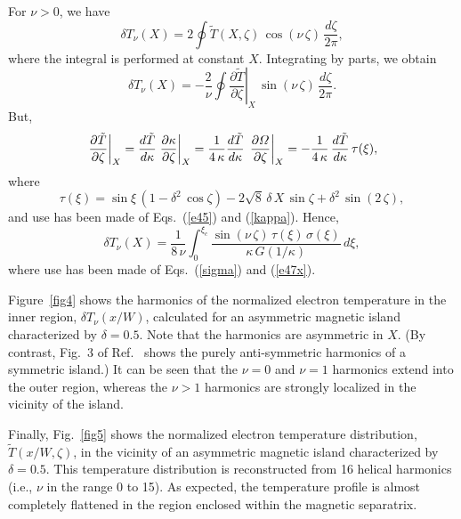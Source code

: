 \documentclass{iopjournal}
\begin{document}
{For $\nu>0$, we have
\begin{equation}
\delta T_\nu(X) = 2\oint\tilde{T}(X,\zeta)\,\cos(\nu\,\zeta)\,\frac{d\zeta}{2\pi},
\end{equation}
where the integral is performed at constant $X$. 
Integrating by parts, we obtain
\begin{equation}
\delta T_\nu(X) = -\frac{2}{\nu}\oint\left.\frac{\partial \tilde{T}}{\partial\zeta}\right|_X\,\sin(\nu\,\zeta)\,\frac{d\zeta}{2\pi}.
\end{equation}
But,
\begin{equation}
\left.\frac{\partial \tilde{T}}{\partial\zeta}\right|_X=\frac{d\tilde{T}}{d\kappa}\left.\frac{\partial \kappa}{\partial\zeta}\right|_{X}
=\frac{1}{4\,\kappa}\frac{d\tilde{T}}{d\kappa}\,\left.\frac{\partial {\mit\Omega}}{\partial\zeta}\right|_{X}=-\frac{1}{4\,\kappa}\,\frac{d\tilde{T}}{d\kappa}\,\tau(\xi),
\end{equation}
where
\begin{equation}
\tau(\xi) = \sin\xi\,(1-\delta^2\,\cos\zeta)  -2\sqrt{8}\,\delta\,X\,\sin\zeta +\delta^2\,\sin(2\,\zeta),
\end{equation}
and use has been made of Eqs.~(\ref{e45}) and (\ref{kappa}). 
Hence,
\begin{equation}
\delta T_\nu(X) =\frac{1}{8\,\nu}\int_0^{\xi_c}\frac{\sin(\nu\,\zeta)\,\tau(\xi)\,\sigma(\xi)}{\kappa\,G(1/\kappa)}\,d\xi,
\end{equation}
where use has been made of Eqs.~(\ref{sigma}) and (\ref{e47x}).

Figure~\ref{fig4} shows the harmonics of the normalized electron temperature  in the inner region, $\delta T_\nu(x/W)$, calculated for an asymmetric
magnetic island characterized by $\delta=0.5$.  Note that the harmonics are asymmetric in $X$. 
(By contrast, Fig.~3 of Ref.~\cite{ntm2} 
shows
the purely anti-symmetric harmonics of a symmetric island.) It can be seen that the $\nu=0$ and $\nu=1$ harmonics extend into the outer region, whereas the
$\nu>1$ harmonics are strongly localized in the vicinity of the island. 

Finally, Fig.~\ref{fig5} shows the normalized electron temperature distribution, $\tilde{T}(x/W,\zeta)$, in the vicinity of an asymmetric magnetic island  characterized by
$\delta = 0.5$. This temperature distribution
is reconstructed from 16 helical harmonics (i.e., $\nu$ in the range 0 to 15). As expected, the temperature profile is almost completely flattened in the region enclosed  within the magnetic separatrix. 

}
\end{document}
